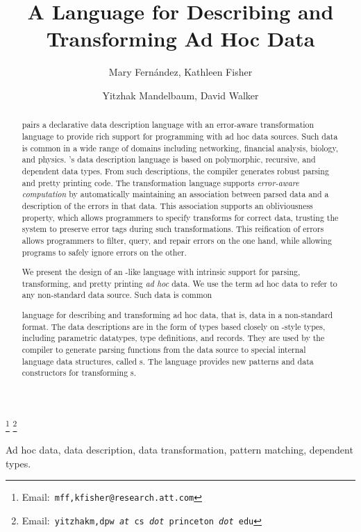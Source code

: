 \documentclass{entcs}
\begin{document}
\begin{frontmatter}
  \title{A Language for Describing and Transforming Ad Hoc Data} 
  \author{Mary Fern\'andez,
    Kathleen Fisher}
  \address{AT\&T\\ 
    Florham Park,NJ USA} 
  \author{Yitzhak Mandelbaum,
    David Walker}
  \address{Department of Computer Science\\ 
    Princeton University\\
    Princeton,NJ USA} 
  \thanks[attemail]{Email:\texttt{\normalshape
        mff,kfisher@research.att.com}}
  \thanks[premail]{Email:\texttt{\normalshape
        yitzhakm,dpw {\it at} cs {\it dot} princeton {\it dot} edu}}
\begin{abstract}
\datatype{} pairs a declarative data description language with an 
error-aware transformation language to provide rich support for
programming with ad hoc data sources.  Such data is common in a wide range of domains including networking, financial analysis, biology, and physics.
\datatype{}'s data description language is based on polymorphic, recursive, and dependent data types.  From such descriptions, the compiler generates robust parsing and pretty printing code. The transformation language supports \textit{error-aware computation} by automatically maintaining an association between parsed data and a description of the errors in that data.  This association supports an obliviousness property, which allows programmers to specify transforms for correct data, trusting the system to preserve error tags during such transformations.
This reification of errors allows programmers to filter, query, and repair errors on the one hand, while allowing programs to safely ignore errors on the other.  

We present the design of an \ml{}-like language with intrinsic support for parsing, transforming, and pretty printing \textit{ad hoc} data. We use the term  ad hoc data to refer to any non-standard data source.  Such data is common 

  
   language for describing and transforming ad hoc data,
  that is, data in a non-standard format. The data descriptions are in
  the form of types based closely on \ml{}-style types, including
  parametric datatypes, type definitions, and records. They are used
  by the compiler to generate parsing functions from the data source
  to special internal language data structures, called \pvalue{}s.
  The language provides new patterns and data constructors for 
  transforming \pvalue{}s.
\end{abstract}
\begin{keyword}
  Ad hoc data, data description, data transformation, pattern matching, 
  dependent types.
\end{keyword}
\end{frontmatter}
\end{document}
